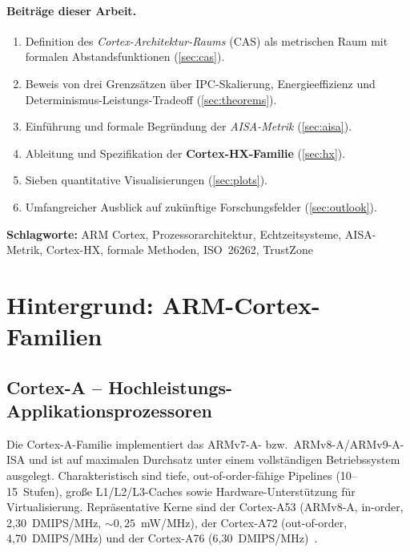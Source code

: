 ﻿\documentclass[a4paper,12pt]{article}
\theoremstyle{plain}
\theoremstyle{definition}
\theoremstyle{remark}
\begin{document}
\paragraph{Beitr\"age dieser Arbeit.}
\begin{enumerate}[label=\textbf{B\arabic*.},leftmargin=2cm]
  \item Definition des \emph{Cortex-Architektur-Raums} (CAS) als metrischen Raum
        mit formalen Abstandsfunktionen (\cref{sec:cas}).
  \item Beweis von drei Grenzs\"atzen \"uber IPC-Skalierung, Energieeffizienz
        und Deter\-minismus-Leistungs-Tradeoff (\cref{sec:theorems}).
  \item Einf\"uhrung und formale Begr\"undung der \emph{AISA-Metrik} (\cref{sec:aisa}).
  \item Ableitung und Spezifikation der \textbf{Cortex-HX-Familie} (\cref{sec:hx}).
  \item Sieben quantitative Visualisierungen (\cref{sec:plots}).
  \item Umfangreicher Ausblick auf zuk\"unftige Forschungsfelder (\cref{sec:outlook}).
\end{enumerate}

\textbf{Schlagworte:} ARM Cortex, Prozessorarchitektur, Echtzeitsysteme,
  AISA-Metrik, Cortex-HX, formale Methoden, ISO~26262, TrustZone

\section{Hintergrund: ARM-Cortex-Familien}\label{sec:background}

\subsection{Cortex-A -- Hochleistungs-Applikationsprozessoren}

Die Cortex-A-Familie implementiert das ARMv7-A- bzw.\ ARMv8-A/ARMv9-A-ISA und ist
auf maximalen Durchsatz unter einem vollst\"andigen Betriebssystem ausgelegt.
Charakteristisch sind tiefe, out-of-order-f\"ahige Pipelines (10--15~Stufen),
gro\ss{}e L1/L2/L3-Caches sowie Hardware-Unterst\"utzung f\"ur Virtualisierung.
Repr\"asentative Kerne sind der Cortex-A53 (ARMv8-A, in-order, 2{,}30~DMIPS/MHz,
${\sim}0{,}25$~mW/MHz), der Cortex-A72 (out-of-order, 4{,}70~DMIPS/MHz) und der
Cortex-A76 (6{,}30~DMIPS/MHz)~\cite{armv9,hennessy2019}.
\end{document}
